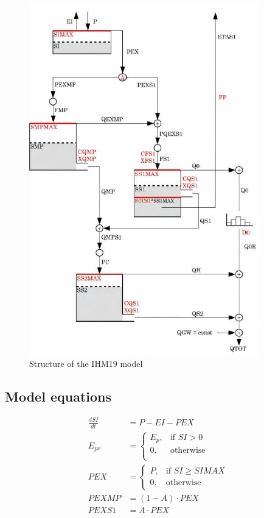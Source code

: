 \begin{figure}{}
\includegraphics[width=10cm,keepaspectratio]{./AppA_files/47_schematic.jpg}
\caption{Structure of the IHM19 model} \label{fig:47_schematic}
\end{figure}

\subsection{Model equations}

\begin{align}
	\frac{dSI}{dt} &= P-EI-PEX \\
	E_{px} &= 
	\begin{cases}
		E_p, & \text{if } SI > 0 \\
		0, & \text{otherwise}\\
	\end{cases}\\
	PEX &= 
	\begin{cases}
		P, & \text{if } SI \geq SIMAX \\
		0, & \text{otherwise}
	\end{cases}\\
	PEXMP &= (1-A)\cdot PEX\\
	PEXS1 &= A\cdot PEX
\end{align}

